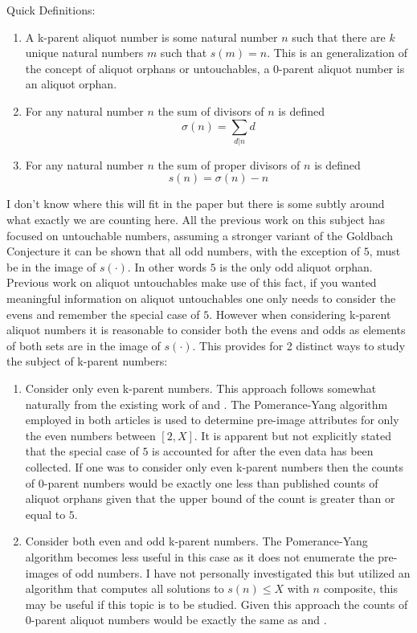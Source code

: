 \documentclass[12pt]{amsart}
\theoremstyle{definition}
\numberwithin{equation}{section}
\begin{document}
Quick Definitions:
\begin{enumerate}
    \item A k-parent aliquot number is some natural number $n$ such that there are $k$ unique natural numbers $m$ such that $s(m) = n$. This is an generalization of the concept of aliquot orphans or untouchables, a 0-parent aliquot number is an aliquot orphan. 
    \item For any natural number $n$ the sum of divisors of $n$ is defined $$\sigma(n) = \sum_{d|n} d$$
    \item For any natural number $n$ the sum of proper divisors of $n$ is defined $$s(n) = \sigma(n) - n$$ 
\end{enumerate}

I don't know where this will fit in the paper but there is some subtly around what exactly we are counting here. All the previous work on this subject has focused on untouchable numbers, assuming a stronger variant of the Goldbach Conjecture it can be shown that all odd numbers, with the exception of $5$, must be in the image of $s(\cdot)$. In other words $5$ is the only odd aliquot orphan. \\ 

Previous work on aliquot untouchables make use of this fact, if you wanted meaningful information on aliquot untouchables one only needs to consider the evens and remember the special case of $5$. However when considering k-parent aliquot numbers it is reasonable to consider both the evens and odds as elements of both sets are in the image of $s(\cdot)$. This provides for 2 distinct ways to study the subject of k-parent numbers:  
\begin{enumerate}
    \item Consider only even k-parent numbers. This approach follows somewhat naturally from the existing work of \cite{chum} and \cite{pomYang}. The Pomerance-Yang algorithm employed in both articles is used to determine pre-image attributes for only the even numbers between $[2, X]$. It is apparent but not explicitly stated that the special case of $5$ is accounted for after the even data has been collected. If one was to consider only even k-parent numbers then the counts of 0-parent numbers would be exactly one less than published counts of aliquot orphans given that the upper bound of the count is greater than or equal to $5$.
    \item Consider both even and odd k-parent numbers. The Pomerance-Yang algorithm becomes less useful in this case as it does not enumerate the pre-images of odd numbers. I have not personally investigated this but \cite{riele} utilized an algorithm that computes all solutions to $s(n) \leq X$ with $n$ composite, this may be useful if this topic is to be studied. Given this approach the counts of 0-parent aliquot numbers would be exactly the same as \cite{pomYang} and \cite{chum}.
\end{enumerate}
\end{document}
